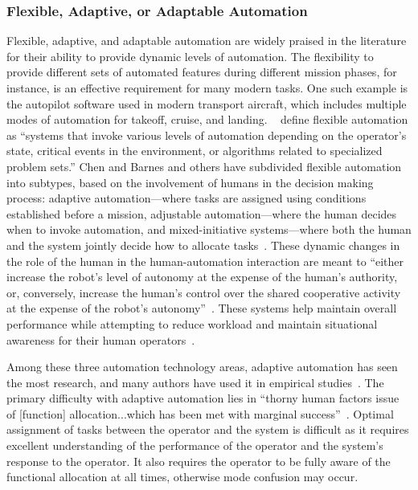 \subsubsection{Flexible, Adaptive, or Adaptable Automation}
Flexible, adaptive, and adaptable automation are widely praised in the literature for their ability to provide dynamic levels of automation.
The flexibility to provide different sets of automated features during different mission phases, for instance, is an effective requirement for many modern tasks.
One such example is the autopilot software used in modern transport aircraft, which includes multiple modes of automation for takeoff, cruise, and landing.
~\citeauthor{chen_humanagent_2014} define flexible automation as ``systems that invoke various levels of automation depending on the operator's state, critical events in the environment, or algorithms related to specialized problem sets.''
Chen and Barnes and others have subdivided flexible automation into subtypes, based on the involvement of humans in the decision making process: adaptive automation—where tasks are assigned using conditions established before a mission, adjustable automation—where the human decides when to invoke automation, and mixed-initiative systems—where both the human and the system jointly decide how to allocate tasks~\citep{chen_humanagent_2014, beer_toward_2014}.
These dynamic changes in the role of the human in the human-automation interaction are meant to ``either increase the robot's level of autonomy at the expense of the human's authority, or, conversely, increase the human's control over the shared cooperative activity at the expense of the robot's autonomy''~\citep{losey_review_2018}.
These systems help maintain overall performance while attempting to reduce workload and maintain situational awareness for their human operators~\citep{kaber_situation_2006}.

Among these three automation technology areas, adaptive automation has seen the most research, and many authors have used it in empirical studies~\citep{vagia_literature_2016}.
The primary difficulty with adaptive automation lies in ``thorny human factors issue of [function] allocation...which has been met with marginal success''~\citep{vagia_literature_2016}.
Optimal assignment of tasks between the operator and the system is difficult as it requires excellent understanding of the performance of the operator and the system's response to the operator.
It also requires the operator to be fully aware of the functional allocation at all times, otherwise mode confusion may occur.

